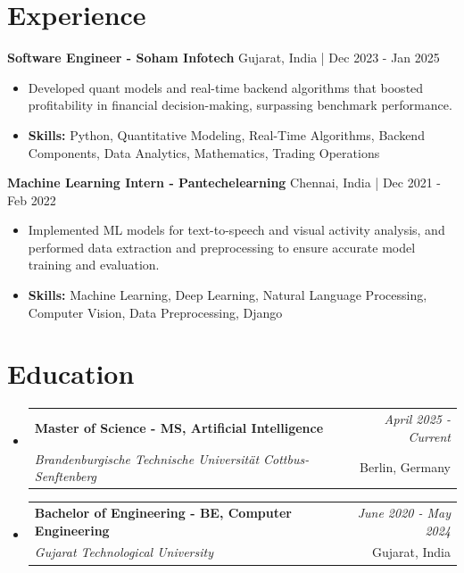 \documentclass[a4paper,11pt]{article}
\makeatletter
\newcommand{\resumeSubheading}[4]{
\vspace{0.5mm}\item
    \begin{tabular*}{\linewidth}[t]{l@{\extracolsep{\fill}}r}
        \textbf{#1} & \textit{\footnotesize{#4}} \\
        \textit{\footnotesize{#3}} &  \footnotesize{#2}\\
    \end{tabular*}
    \vspace{-2.4mm}
}
\makeatother
\begin{document}
\section{\textbf{Experience}}


\vspace{1mm}
  \textbf{Software Engineer - Soham Infotech} \hfill Gujarat, India | Dec 2023 - Jan 2025
\vspace{-1.5mm} %
\begin{itemize}
  \item Developed quant models and real-time backend algorithms that boosted profitability in financial decision-making, surpassing benchmark performance.

\vspace{-2mm}
  \item \textbf{Skills:} Python, Quantitative Modeling, Real-Time Algorithms, Backend Components, Data Analytics, Mathematics, Trading Operations
\end{itemize}

\vspace{1mm}
  \textbf{Machine Learning Intern - Pantechelearning} \hfill Chennai, India | Dec 2021 - Feb 2022
\vspace{-1.5mm} %
\begin{itemize}
  \item Implemented ML models for text-to-speech and visual activity analysis, and performed data extraction and preprocessing to ensure accurate model training and evaluation.
\vspace{-2mm}
  \item \textbf{Skills:} Machine Learning, Deep Learning, Natural Language Processing, Computer Vision, Data Preprocessing, Django
\end{itemize}\section{\textbf{Education}}
\vspace{-0.4mm}

\begin{itemize}[leftmargin=0.15in, label={}]
\resumeSubheading
{Master of Science - MS, Artificial Intelligence }{Berlin, Germany}
{Brandenburgische Technische Universität Cottbus-Senftenberg  }{April 2025 - Current}

\vspace{1.0mm} %
\resumeSubheading
{Bachelor of Engineering - BE, Computer Engineering  }{Gujarat, India}
{Gujarat Technological University }{June 2020 - May 2024}

\end{itemize}
\end{document}

